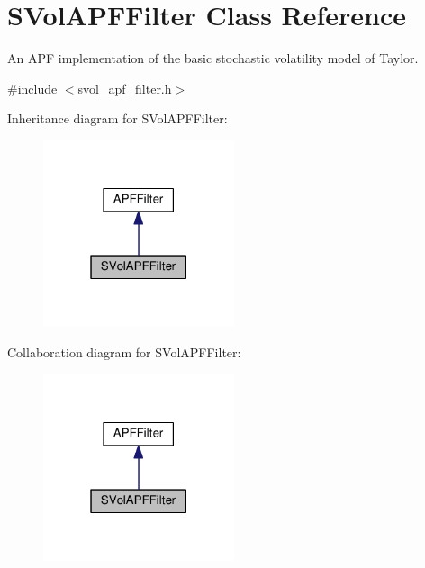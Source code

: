 \hypertarget{classSVolAPFFilter}{}\section{S\+Vol\+A\+P\+F\+Filter Class Reference}
\label{classSVolAPFFilter}


An A\+PF implementation of the basic stochastic volatility model of Taylor.  




{\ttfamily \#include $<$svol\+\_\+apf\+\_\+filter.\+h$>$}



Inheritance diagram for S\+Vol\+A\+P\+F\+Filter\+:\nopagebreak
\begin{figure}[H]
\begin{center}
\leavevmode
\includegraphics[width=159pt]{classSVolAPFFilter__inherit__graph}
\end{center}
\end{figure}


Collaboration diagram for S\+Vol\+A\+P\+F\+Filter\+:\nopagebreak
\begin{figure}[H]
\begin{center}
\leavevmode
\includegraphics[width=159pt]{classSVolAPFFilter__coll__graph}
\end{center}
\end{figure}
